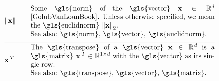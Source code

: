\begin{align}
	&\normgeneric{\featurevec}{}  & \quad &  \parbox{.75\textwidth}{Some \gls{norm} of the \gls{vector} $\featurevec \in \mathbb{R}^{\featuredim}$ \cite{GolubVanLoanBook}. 
		Unless otherwise specified, we mean the \gls{euclidnorm} $\normgeneric{\featurevec}{2}$.
		\\ See also: \gls{norm}, \gls{vector}, \gls{euclidnorm}. } \nonumber \\[2mm] \hline \nonumber\\[-5mm]
	&\featurevec\,^{T} &\quad & \parbox{.75\textwidth}{The \gls{transpose} of a \gls{vector} $\featurevec \in \mathbb{R}^{\dimlocalmodel}$ 
		is a \gls{matrix} $\featurevec\,^{T} \in \mathbb{R}^{1 \times \dimlocalmodel}$ with the \gls{vector} as its single row.
		\\ See also: \gls{transpose}, \gls{vector}, \gls{matrix}. } \nonumber 
\end{align} 

